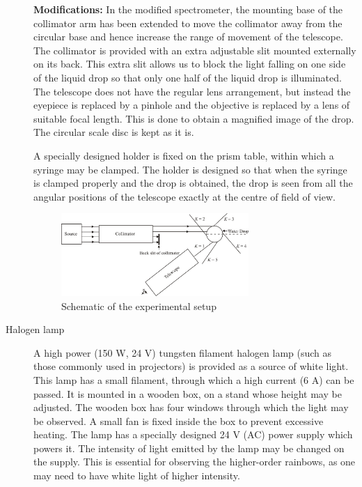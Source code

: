 \begin{refsection}
\begin{description}
    \textbf{Modifications:} In the modified spectrometer, the mounting base of the collimator arm has been extended to move the collimator away from the circular base and hence increase the range of movement of the telescope. The collimator is provided with an extra adjustable slit mounted externally on its back. This extra slit allows us to block the light falling on one side of the liquid drop so that only one half of the liquid drop is illuminated. The telescope does not have the regular lens arrangement, but instead the eyepiece is replaced by a pinhole and the objective is replaced by a lens of suitable focal length. This is done to obtain a magnified image of the drop. The circular scale disc is kept as it is. 

    A specially designed holder is fixed on the prism table, within which a syringe may be clamped. The holder is designed so that when the syringe is clamped properly and the drop is obtained, the drop is seen from all the angular positions of the telescope exactly at the centre of field of view. 

    \begin{figure}[!htb]
        \centering
        \includegraphics[width=0.70\textwidth]{figs/img2.jpg}
        \caption{Schematic of the experimental setup}
        \label{fig:experimentalsetup}
    \end{figure}

    \item[Halogen lamp]

    A high power (150 W, 24 V) tungsten filament halogen lamp (such as those commonly used in projectors) is provided as a source of white light. This lamp has a small filament, through which a high current (6 A) can be passed. It is mounted in a wooden box, on a stand whose height may be adjusted. The wooden box has four windows through which the light may be observed. A small fan is fixed inside the box to prevent excessive heating. The lamp has a specially designed 24 V (AC) power supply which powers it. The intensity of light emitted by the lamp may be changed on the supply. This is essential for observing the higher-order rainbows, as one may need to have white light of higher intensity.


\end{description}
\end{refsection}
